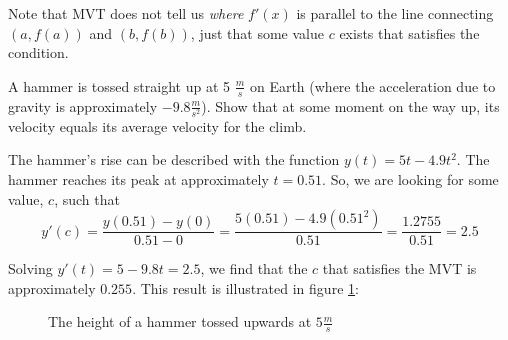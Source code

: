 Note that MVT does not tell us \textit{where} $f'(x)$ is parallel to the line 
connecting $(a, f(a))$ and $(b, f(b))$, just that some value $c$ exists that 
satisfies the condition. 

\begin{Worked}
\begin{Problem}
A hammer is tossed straight up at 5 $\frac{m}{s}$ on
Earth (where the acceleration due to gravity is approximately $-9.8 
\frac{m}{s^2}$). Show that at some moment on the way up, its velocity
equals its average velocity for the climb.
\end{Problem}
\begin{Solution}
The hammer's rise can be described with the function $y(t) = 5t-4.9t^2$. The 
hammer reaches its peak at approximately $t=0.51$. So, we are looking for some 
value, $c$, such that $$y'(c) = \frac{y(0.51) - y(0)}{0.51 - 0} = \frac{5(0.51) 
- 4.9(0.51^2)}{0.51} = \frac{1.2755}{0.51} = 2.5$$

Solving $y'(t) = 5-9.8t = 2.5$, we find that the $c$ that satisfies the MVT is 
approximately $0.255$. This result is illustrated in figure \ref{fig:hammer}:

\begin{figure}[H]
\centering
{}
\caption{The height of a hammer tossed upwards at $5 \frac{m}{s}$}
\label{fig:hammer}
\end{figure}
\end{Solution}
\end{Worked}

